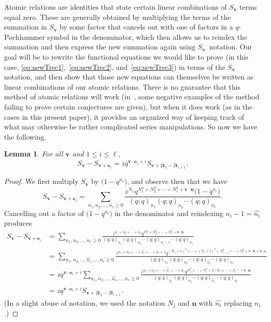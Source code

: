 \documentclass[10pt,a4paper]{amsart}
\numberwithin{equation}{section}
\newtheorem{Lemma}[Theorem]{Lemma}
\theoremstyle{definition}
\newcommand{\nihat}{{\widehat{n_i}}}
\newcommand{\tr}{\mathbf{t}}
\newcommand{\nn}{\mathbf{n}}
\newcommand{\vv}{\mathbf{v}}
\newcommand{\ee}{\mathbf{e}}
\begin{document}
Atomic relations are identities that state certain linear combinations of $S_\vv$ terms equal zero. These are generally obtained by multiplying the terms of the summation in $S_\vv$ by some factor that cancels out with one of factors in a $q$-Pochhammer symbol in the denominator, which then allows us to reindex the summation and then express the new summation again using $S_\vv$~notation. Our goal will be to rewrite the functional equations we would like to prove (in this case, \eqref{eq:newTrec1},~\eqref{eq:newTrec2}, and~\eqref{eq:newTrec3}) in terms of the $S_\vv$ notation, and then show that those new equations can themselves be written as linear combinations of our atomic relations. There is no guarantee that this method of atomic relations will work (in~\cite{KanRus-cylindric}, some negative examples of the method failing to prove certain conjectures are given), but when it does work (as in the cases in this present paper), it provides an organized way of keeping track of what may otherwise be rather complicated series manipulations. So now we have the following.
\begin{Lemma} \label{lem:atomAG}
For all $\vv$ and $1\le i \le \ell,$
\begin{equation*}
S_\vv - S_{\vv+\ee_i} = zq^{\vv\cdot\ee_i+i} S_{\vv+2\tr_1-2\tr_{i+1}}.
\end{equation*}
\end{Lemma}
\begin{proof}
We first multiply $S_\vv$ by $\bigl(1-q^{n_i}\bigr)$, and observe then that we have
\begin{equation*}
S_\vv-S_{\vv+\ee_i} =\sum_{n_1,n_2,\dots,n_{\ell}\ge 0} \frac{z^{N_1}q^{N_1^2+N_2^2+\cdots+N_{\ell}^2+\vv \cdot \nn}\bigl(1-q^{n_i}\bigr)}{(q;q)_{n_1}(q;q)_{n_2}\cdots(q;q)_{n_{\ell}}}.
\end{equation*}
Cancelling out a factor of $\bigl(1-q^{n_i}\bigr)$ in the denominator and reindexing $n_{i}-1 = \nihat$ produces
\begin{align*}
S_\vv-S_{\vv+\ee_i} &=\sum_{n_1,n_2,\dots,n_{\ell}\ge 0} \frac{z^{n_1+n_2+\cdots+n_{\ell}}q^{N_1^2+N_2^2+\cdots+N_{\ell}^2+\vv \cdot \nn}}{(q;q)_{n_1}(q;q)_{n_2}\cdots(q;q)_{n_{i}-1}\cdots(q;q)_{n_{\ell}}} \\
&=\sum_{n_1,n_2,\dots,\nihat,\dots,n_{\ell}\ge 0}\!\!\!\! \frac{z^{n_1+n_2+\cdots+\nihat+\cdots+n_{\ell}+1}q^{(N_1+1)^2+\cdots+(N_i+1)^2+N_{i+1}^2+\cdots+N_{\ell}^2+\vv \cdot \nn+\vv\cdot\ee_i}}{(q;q)_{n_1}(q;q)_{n_2}\cdots(q;q)_{\nihat}\cdots(q;q)_{n_{\ell}}} \\
&=zq^{\vv\cdot\ee_i+i}\sum_{n_1,n_2,\dots,\nihat,\dots,n_{\ell}\ge 0} \frac{z^{n_1+n_2+\cdots+\nihat+\cdots+n_{\ell}}q^{N_1^2+\cdots+N_{\ell}^2+2(N_1+\cdots+N_i)+\vv \cdot \nn}}{(q;q)_{n_1}(q;q)_{n_2}\cdots(q;q)_{\nihat}\cdots(q;q)_{n_{\ell}}} \\
&= zq^{\vv\cdot\ee_i+i} S_{\vv+2\tr_1-2\tr_{i+1}}.
\end{align*}
(In a slight abuse of notation, we used the notation $N_j$ and $\nn$ with $\nihat$ replacing $n_i$.)
\end{proof}
\end{document}
